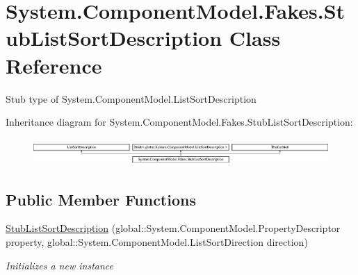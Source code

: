 \hypertarget{class_system_1_1_component_model_1_1_fakes_1_1_stub_list_sort_description}{\section{System.\-Component\-Model.\-Fakes.\-Stub\-List\-Sort\-Description Class Reference}
\label{class_system_1_1_component_model_1_1_fakes_1_1_stub_list_sort_description}
}


Stub type of System.\-Component\-Model.\-List\-Sort\-Description 


Inheritance diagram for System.\-Component\-Model.\-Fakes.\-Stub\-List\-Sort\-Description\-:\begin{figure}[H]
\begin{center}
\leavevmode
\includegraphics[height=1.031308cm]{class_system_1_1_component_model_1_1_fakes_1_1_stub_list_sort_description}
\end{center}
\end{figure}
\subsection*{Public Member Functions}
\begin{DoxyCompactItemize}
\item 
\hyperlink{class_system_1_1_component_model_1_1_fakes_1_1_stub_list_sort_description_a950c495c21db4507782f1120e58bd2b8}{Stub\-List\-Sort\-Description} (global\-::\-System.\-Component\-Model.\-Property\-Descriptor property, global\-::\-System.\-Component\-Model.\-List\-Sort\-Direction direction)
\begin{DoxyCompactList}\small\item\em Initializes a new instance\end{DoxyCompactList}\end{DoxyCompactItemize}
